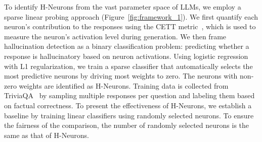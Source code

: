 \documentclass[dvipsnames]{article}
\begin{document}
To identify H-Neurons from the vast parameter space of LLMs, we employ a sparse linear probing approach (Figure~\ref{fig:framework_1}). We first quantify each neuron's contribution to the responses using the CETT metric~\citep{relu2wins}, which is used to measure the neuron's activation level during generation. 
We then frame hallucination detection as a binary classification problem: predicting whether a response is hallucinatory based on neuron activations. Using logistic regression with L1 regularization, we train a sparse classifier that automatically selects the most predictive neurons by driving most weights to zero. 
The neurons with non-zero weights are identified as H-Neurons. Training data is collected from TriviaQA~\citep{Triviaqa} by sampling multiple responses per question and labeling them based on factual correctness. To present the effectiveness of H-Neurons, we establish a baseline by training linear classifiers using randomly selected neurons. To ensure the fairness of the comparison, the number of randomly selected neurons is the same as that of H-Neurons.


\end{document}
